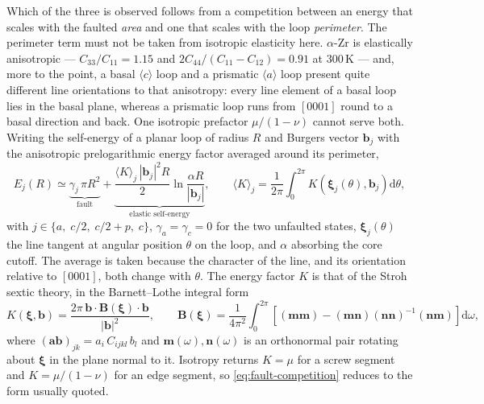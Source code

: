 \documentclass{article}
\newcommand{\tensor}[1]{\bm{#1}}
\newcommand{\aloop}{\ensuremath{\langle a\rangle}}
\newcommand{\cloop}{\ensuremath{\langle c\rangle}}
\newcommand{\bvec}{\bm b}
\begin{document}
Which of the three is observed follows from a competition between an energy that
scales with the faulted \emph{area} and one that scales with the loop
\emph{perimeter}. The perimeter term must not be taken from isotropic elasticity
here. $\alpha$-Zr is elastically anisotropic --- $C_{33}/C_{11}=1.15$ and
$2C_{44}/(C_{11}-C_{12})=0.91$ at $300\,$K \citep{fisher1964single} --- and, more
to the point, a basal \cloop{} loop and a prismatic \aloop{} loop present quite
different line orientations to that anisotropy: every line element of a basal
loop lies in the basal plane, whereas a prismatic loop runs from $[0001]$ round
to a basal direction and back. One isotropic prefactor $\mu/(1-\nu)$ cannot serve
both. Writing the self-energy of a planar loop of radius $R$ and Burgers vector
$\bvec_j$ with the anisotropic prelogarithmic energy factor averaged around its
perimeter,
\begin{equation}
  E_j(R)\simeq\underbrace{\gamma_j\,\pi R^2}_{\text{fault}}
   +\underbrace{\frac{\langle K\rangle_j\,|\bvec_j|^2R}{2}
     \ln\frac{\alpha R}{|\bvec_j|}}_{\text{elastic self-energy}},
  \qquad
  \langle K\rangle_j=\frac{1}{2\pi}\int_0^{2\pi}\!
     K\!\left(\bm\xi_j(\theta),\bvec_j\right)\mathrm{d}\theta,
  \label{eq:fault-competition}
\end{equation}
with $j\in\{a,\;c/2,\;c/2{+}p,\;c\}$, $\gamma_a=\gamma_c=0$ for the two unfaulted
states, $\bm\xi_j(\theta)$ the line tangent at angular position $\theta$ on the
loop, and $\alpha$ absorbing the core cutoff. The average is taken because the
character of the line, and its orientation relative to $[0001]$, both change with
$\theta$. The energy factor $K$ is that of the Stroh sextic theory, in the
Barnett--Lothe integral form
\citep{barnett1973synthesis,bacon1979anisotropic,hirth1982theory}
\begin{equation}
  K(\bm\xi,\bvec)=\frac{2\pi\,\bvec\!\cdot\!\tensor B(\bm\xi)\!\cdot\!\bvec}
                       {|\bvec|^2},
  \qquad
  \tensor B(\bm\xi)=\frac{1}{4\pi^2}\int_0^{2\pi}\!\!
    \left[(\bm{mm})-(\bm{mn})(\bm{nn})^{-1}(\bm{nm})\right]\mathrm{d}\omega,
  \label{eq:Kfactor}
\end{equation}
where $(\bm{ab})_{jk}=a_i\,C_{ijkl}\,b_l$ and $\bm m(\omega),\bm n(\omega)$ is an
orthonormal pair rotating about $\bm\xi$ in the plane normal to it. Isotropy
returns $K=\mu$ for a screw segment and $K=\mu/(1-\nu)$ for an edge segment, so
\cref{eq:fault-competition} reduces to the form usually quoted.
\end{document}
